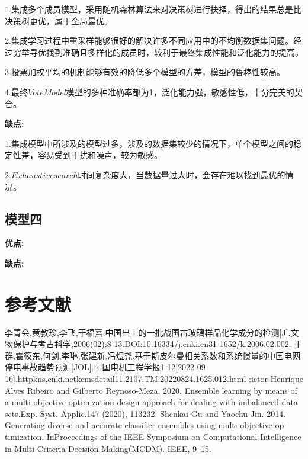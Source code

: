 \documentclass[UTF8]{ctexart}
\begin{document}
1.集成多个成员模型，采用随机森林算法来对决策树进行抉择，得出的结果总是比决策树更优，属于全局最优。

2.集成学习过程中重采样能够很好的解决许多不同应用中的不均衡数据集问题。经过穷举寻优找到准确且多样化的成员时，较利于最终集成性能和泛化能力的提高。

3.投票加权平均的机制能够有效的降低多个模型的方差，模型的鲁棒性较高。

4.最终$VoteModel$模型的多种准确率都为1，泛化能力强，敏感性低，十分完美的契合。

\textbf{缺点:}

1.集成模型中所涉及的模型过多，涉及的数据集较少的情况下，单个模型之间的稳定性差，容易受到干扰和噪声，较为敏感。

2.$Exhaustive search$时间复杂度大，当数据量过大时，会存在难以找到最优的情况。

\subsection{模型四}
\textbf{优点:}


\textbf{缺点:}


\section{参考文献}



\begin{thebibliography}{100}

    李青会,黄教珍,李飞,干福熹.中国出土的一批战国古玻璃样品化学成分的检测[J].文物保护与考古科学,2006(02):8-13.DOI:10.16334/j.cnki.cn31-1652/k.2006.02.002.
    于群,霍筱东,何剑,李琳,张建新,冯煜尧.基于斯皮尔曼相关系数和系统惯量的中国电网停电事故趋势预测[JOL].中国电机工程学报1-12[2022-09-16].httpkns.cnki.netkcmsdetail11.2107.TM.20220824.1625.012.html
    :ictor Henrique Alves Ribeiro and Gilberto Reynoso-Meza. 2020. Ensemble learning by means of a multi-objective optimization design approach for dealing with imbalanced data sets.Exp. Syst. Applic.147 (2020), 113232.
    Shenkai Gu and Yaochu Jin. 2014. Generating diverse and accurate classifier ensembles using multi-objective op-timization. InProceedings of the IEEE Symposium on Computational Intelligence in Multi-Criteria Decision-Making(MCDM). IEEE, 9–15.
    
    \end{thebibliography}
\noindent{}
\noindent{}
\end{document}
